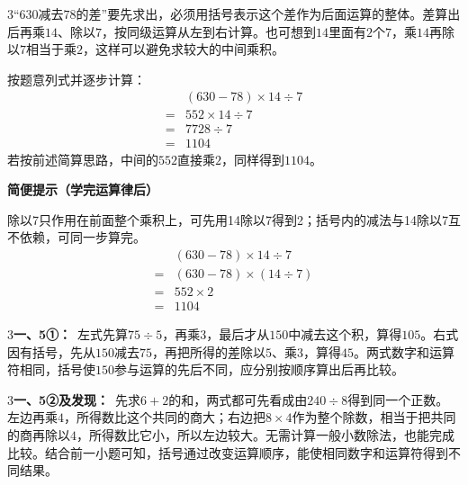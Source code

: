 \documentclass[multi=snippet,border={5bp 20bp 5bp 5bp}]{standalone}
\newenvironment{snippet}[3]{\begin{minipage}{#1bp}\color{answerred}\fontsize{#2}{#3}\selectfont\raggedright}{\end{minipage}}
\begin{document}
\begin{snippet}{505}{11.5}{14}\begin{multicols}{3}\raggedcolumns “\(630\)\allowbreak 减去\(78\)\allowbreak 的差”要先求出，必须用括号表示这个差作为后面运算的整体。差算出后再乘\(14\)\allowbreak 、除以\(7\)\allowbreak ，按同级运算从左到右计算。也可想到\(14\)\allowbreak 里面有\(2\)\allowbreak 个\(7\)\allowbreak ，乘\(14\)\allowbreak 再除以\(7\)\allowbreak 相当于乘\(2\)\allowbreak ，这样可以避免求较大的中间乘积。\par 按题意列式并逐步计算：\[\begin{aligned}&(630-78)\times14\div7\\={}&552\times14\div7\\={}&7728\div7\\={}&1104\end{aligned}\]若按前述简算思路，中间的\(552\)\allowbreak 直接乘\(2\)\allowbreak ，同样得到\(1104\)\allowbreak 。\par\textbf{简便提示（学完运算律后）}\par 除以7只作用在前面整个乘积上，可先用14除以7得到2；括号内的减法与14除以7互不依赖，可同一步算完。\[\begin{aligned}&(630-78)\times14\div7\\={}&(630-78)\times(14\div7)\\={}&552\times2\\={}&1104\end{aligned}\]\end{multicols}\end{snippet}
\begin{snippet}{505}{11.5}{14}\begin{multicols}{3}\raggedcolumns \textbf{一、5①：}\ 左式先算\(75\div5\)\allowbreak ，再乘\(3\)\allowbreak ，最后才从\(150\)\allowbreak 中减去这个积，算得\(105\)\allowbreak 。右式因有括号，先从\(150\)\allowbreak 减去\(75\)\allowbreak ，再把所得的差除以\(5\)\allowbreak 、乘\(3\)\allowbreak ，算得\(45\)\allowbreak 。两式数字和运算符相同，括号使\(150\)\allowbreak 参与运算的先后不同，应分别按顺序算出后再比较。\end{multicols}\end{snippet}
\begin{snippet}{505}{11.5}{14}\begin{multicols}{3}\raggedcolumns \textbf{一、5②及发现：}\ 先求\(6+2\)\allowbreak 的和，两式都可先看成由\(240\div8\)\allowbreak 得到同一个正数。左边再乘\(4\)\allowbreak ，所得数比这个共同的商大；右边把\(8\times4\)\allowbreak 作为整个除数，相当于把共同的商再除以\(4\)\allowbreak ，所得数比它小，所以左边较大。无需计算一般小数除法，也能完成比较。结合前一小题可知，括号通过改变运算顺序，能使相同数字和运算符得到不同结果。\end{multicols}\end{snippet}
\end{document}
